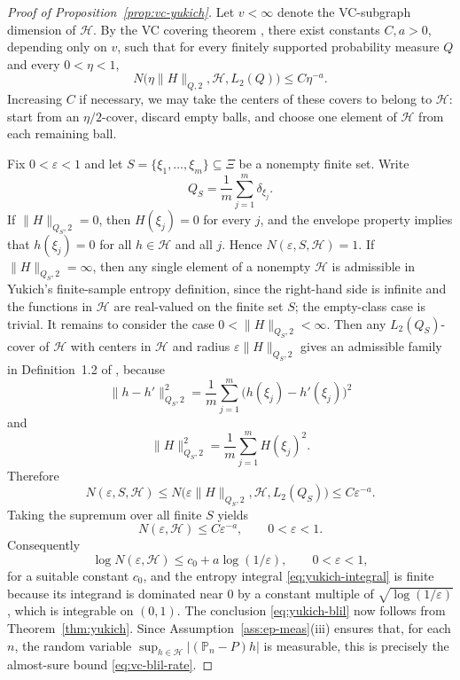 \documentclass[11pt]{article}
\begin{document}
\begin{proof}[Proof of Proposition~\ref{prop:vc-yukich}]
Let $v<\infty$ denote the VC-subgraph dimension of $\mathcal{H}$.
By the VC covering theorem \citep[Theorem~2.6.7]{vdVW2023}, there
exist constants $C,a>0$, depending only on $v$, such that for every
finitely supported probability measure $Q$ and every $0<\eta<1$,
\begin{equation}
N\bigl(\eta\lVert H\rVert_{Q,2},\mathcal{H},L_{2}(Q)\bigr)\le C\eta^{-a}.\label{eq:vc-l2-cover}
\end{equation}
Increasing $C$ if necessary, we may take the centers of these covers
to belong to $\mathcal{H}$: start from an $\eta/2$-cover, discard
empty balls, and choose one element of $\mathcal{H}$ from each remaining
ball.

Fix $0<\varepsilon<1$ and let $S=\{\xi_{1},\dots,\xi_{m}\}\subseteq\Xi$
be a nonempty finite set. Write 
\[
Q_{S}=\frac{1}{m}\sum_{j=1}^{m}\delta_{\xi_{j}}.
\]
If $\lVert H\rVert_{Q_{S},2}=0$, then $H(\xi_{j})=0$ for every $j$,
and the envelope property implies that $h(\xi_{j})=0$ for all $h\in\mathcal{H}$
and all $j$. Hence $N(\varepsilon,S,\mathcal{H})=1$. If
$\lVert H\rVert_{Q_{S},2}=\infty$, then any single element of a nonempty
$\mathcal{H}$ is admissible in Yukich's finite-sample entropy definition,
since the right-hand side is infinite and the functions in $\mathcal{H}$
are real-valued on the finite set $S$; the empty-class case is trivial.
It remains to consider the case $0<\lVert H\rVert_{Q_{S},2}<\infty$.
Then any $L_{2}(Q_{S})$-cover of $\mathcal{H}$ with centers in $\mathcal{H}$
and radius $\varepsilon\lVert H\rVert_{Q_{S},2}$ gives an admissible family
in Definition~1.2 of \citet{Yukich1990}, because 
\[
\lVert h-h'\rVert_{Q_{S},2}^{2}=\frac{1}{m}\sum_{j=1}^{m}\bigl(h(\xi_{j})-h'(\xi_{j})\bigr)^{2}
\]
and 
\[
\lVert H\rVert_{Q_{S},2}^{2}=\frac{1}{m}\sum_{j=1}^{m}H(\xi_{j})^{2}.
\]
Therefore 
\[
N(\varepsilon,S,\mathcal{H})\le N\bigl(\varepsilon\lVert H\rVert_{Q_{S},2},\mathcal{H},L_{2}(Q_{S})\bigr)\le C\varepsilon^{-a}.
\]
Taking the supremum over all finite $S$ yields 
\[
N(\varepsilon,\mathcal{H})\le C\varepsilon^{-a},\qquad0<\varepsilon<1.
\]
Consequently 
\[
\log N(\varepsilon,\mathcal{H})\le c_{0}+a\log(1/\varepsilon),\qquad0<\varepsilon<1,
\]
for a suitable constant $c_{0}$, and the entropy integral \eqref{eq:yukich-integral}
is finite because its integrand is dominated near $0$ by a constant
multiple of $\sqrt{\log(1/\varepsilon)}$, which is integrable on
$(0,1)$. The conclusion \eqref{eq:yukich-blil} now follows from
Theorem~\ref{thm:yukich}. Since Assumption~\ref{ass:ep-meas}(iii)
ensures that, for each $n$, the random variable
$\sup_{h\in\mathcal{H}}\lvert(\mathbb{P}_{n}-P)h\rvert$ is measurable,
this is precisely the almost-sure bound \eqref{eq:vc-blil-rate}. 
\end{proof}
\end{document}
